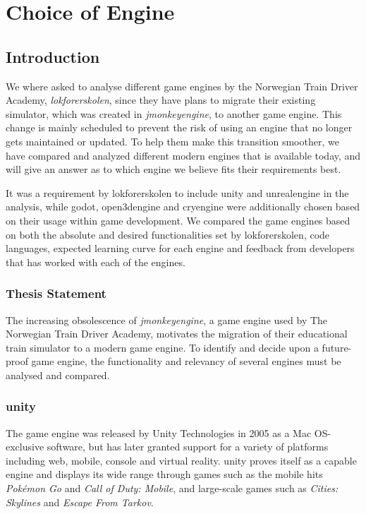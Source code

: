 \chapter{Choice of Engine}


\section{Introduction}
We where asked to analyse different game engines by the Norwegian Train Driver Academy, \textit{\Gls{lokforerskolen}}, since they have plans to migrate their existing simulator\footnotemark[1], which was created in \textit{\gls{jmonkeyengine}}, to another game engine. This change is mainly scheduled to prevent the risk of using an engine that no longer gets maintained or updated. To help them make this transition smoother, we have compared and analyzed different modern engines that is available today, and will give an answer as to which engine we believe fits their requirements best.

It was a requirement by \Gls{lokforerskolen} to include \Gls{unity} and \Gls{unrealengine} in the analysis, while \Gls{godot}, \Gls{open3dengine} and \Gls{cryengine} were additionally chosen based on their usage within game development.\cite{g2_game_engines_comp}
We compared the game engines based on both the absolute and desired functionalities set by \Gls{lokforerskolen}, code languages, expected learning curve for each engine and feedback from developers that has worked with each of the engines. 



\subsection{Thesis Statement}
The increasing obsolescence of \textit{\gls{jmonkeyengine}}, a game engine used by The Norwegian Train Driver Academy, motivates the migration of their educational train simulator to a modern game engine. To identify and decide upon a future-proof game engine, the functionality and relevancy of several engines must be analysed and compared.


\subsection{\Gls{unity}} 
The game engine was released by Unity Technologies in 2005 as a Mac OS-exclusive software, but has later granted support for a variety of platforms including web, mobile, console and virtual reality. \Gls{unity} proves itself as a capable engine and displays its wide range through games such as the mobile hits \textit{Pokémon Go} and \textit{Call of Duty: Mobile}, and large-scale games such as \textit{Cities: Skylines} and \textit{Escape From Tarkov}.

